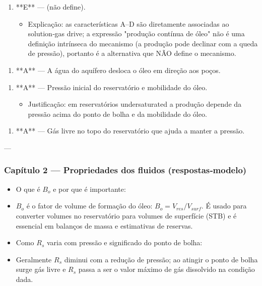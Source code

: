 \documentclass[11pt,a4paper]{article}
\begin{document}
\begin{enumerate}
\item **E** — (não define).  
\begin{itemize}
\item Explicação: as características A–D são diretamente associadas ao solution‑gas drive; a expressão "produção contínua de óleo" não é uma definição intrínseca do mecanismo (a produção pode declinar com a queda de pressão), portanto é a alternativa que NÃO define o mecanismo.
\end{itemize}
\end{enumerate}

\begin{enumerate}
\item **A** — A água do aquífero desloca o óleo em direção aos poços.
\end{enumerate}

\begin{enumerate}
\item **A** — Pressão inicial do reservatório e mobilidade do óleo.
\begin{itemize}
\item Justificação: em reservatórios undersaturated a produção depende da pressão acima do ponto de bolha e da mobilidade do óleo.
\end{itemize}
\end{enumerate}

\begin{enumerate}
\item **A** — Gás livre no topo do reservatório que ajuda a manter a pressão.
\end{enumerate}

---

\subsubsection{Capítulo 2 — Propriedades dos fluidos (respostas‑modelo)}
\begin{itemize}
\item O que é $B_o$ e por que é importante:
\item $B_o$ é o fator de volume de formação do óleo: $B_o=V_{res}/V_{surf}$. É usado para converter volumes no reservatório para volumes de superfície (STB) e é essencial em balanços de massa e estimativas de reservas.
\end{itemize}

\begin{itemize}
\item Como $R_s$ varia com pressão e significado do ponto de bolha:
\item Geralmente $R_s$ diminui com a redução de pressão; ao atingir o ponto de bolha surge gás livre e $R_s$ passa a ser o valor máximo de gás dissolvido na condição dada.
\end{itemize}
\end{document}
